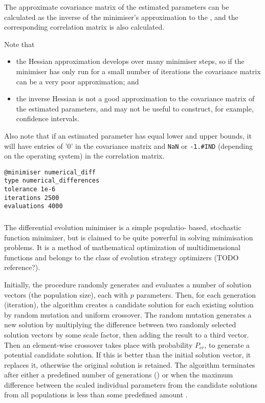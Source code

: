 The approximate covariance matrix of the estimated parameters can be calculated as the inverse of the minimiser's approximation to the , and the corresponding correlation matrix is also calculated.

Note that

\begin{itemize}
\item the Hessian approximation develops over many minimiser steps, so if the minimiser has only run for a small number of iterations the covariance matrix can be a very poor approximation; and
\item the inverse Hessian is not a good approximation to the covariance matrix of the estimated parameters, and may not be useful to construct, for example, confidence intervals.
\end{itemize}

Also note that if an estimated parameter has equal lower and upper bounds, it will have entries of '0' in the covariance matrix and \texttt{NaN} or \texttt{-1.\#IND} (depending on the operating system) in the correlation matrix.

{\small{\begin{verbatim}
@minimiser numerical_diff
type numerical_differences
tolerance 1e-6
iterations 2500
evaluations 4000
\end{verbatim}}}

\subsubsection{}

The differential evolution minimiser is a simple populatio- based, stochastic function minimizer, but is claimed to be quite powerful in solving minimisation problems. It is a method of mathematical optimization of multidimensional functions and belongs to the class of evolution strategy optimizers (TODO reference?).

Initially, the procedure randomly generates and evaluates a number of solution vectors (the population size), each with $p$ parameters. Then, for each generation (iteration), the algorithm creates a candidate solution for each existing solution by random mutation and uniform crossover. The random mutation generates a new solution by multiplying the difference between two randomly selected solution vectors by some scale factor, then adding the result to a third vector. Then an element-wise crossover takes place with probability $P_{cr}$, to generate a potential candidate solution. If this is better than the initial solution vector, it replaces it, otherwise the original solution is retained. The algorithm terminates after either a predefined number of generations () or when the maximum difference between the scaled individual parameters from the candidate solutions from all populations is less than some predefined amount .

